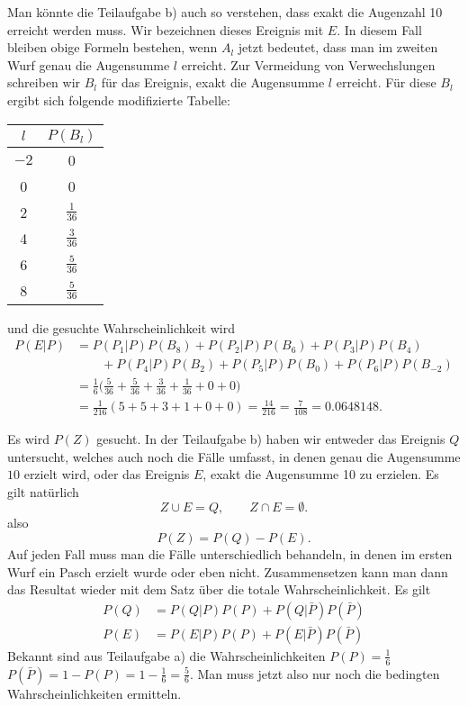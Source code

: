 \begin{loesung}
\begin{teilaufgaben}
Man könnte die Teilaufgabe b) auch so verstehen, dass exakt die
Augenzahl 10 erreicht werden muss. Wir bezeichnen dieses Ereignis
mit $E$. In diesem Fall bleiben obige
Formeln bestehen, wenn $A_l$ jetzt bedeutet, dass man im zweiten
Wurf genau die Augensumme $l$ erreicht. Zur Vermeidung von Verwechslungen
schreiben wir $B_l$ für das Ereignis, exakt die Augensumme $l$ erreicht.
Für diese $B_l$ ergibt sich
folgende modifizierte Tabelle:
\begin{center}
\begin{tabular}{|c|c|}
\hline
$l$&$P(B_l)$\\
\hline
$-2$&0\\
0&0\\
2&$\frac{1}{36}$\\
4&$\frac{3}{36}$\\
6&$\frac{5}{36}$\\
8&$\frac{5}{36}$\\
\hline
\end{tabular}
\end{center}
und die gesuchte Wahrscheinlichkeit wird
\begin{align*}
P(E|P)
&=P(P_1|P) P(B_8) + P(P_2|P) P(B_6) + P(P_3|P) P(B_4) \\
&\qquad + P(P_4|P)P(B_2) + P(P_5|P) P(B_0) + P(P_6|P) P(B_{-2})\\
&=
\frac1{6}\biggl(\frac{5}{36} + \frac{5}{36} + \frac{3}{36} + \frac{1}{36} + 0 + 0\biggr)
\\
&=
\frac1{216}(5 + 5 + 3 + 1 + 0 + 0)
=
\frac{14}{216}=\frac{7}{108}=0.0648148.
\end{align*}

\item
Es wird $P(Z)$ gesucht.
In der Teilaufgabe b) haben wir entweder das Ereignis
$Q$ untersucht, welches auch noch die Fälle umfasst, in denen genau
die Augensumme $10$ erzielt wird, oder das Ereignis $E$, exakt die Augensumme
10 zu erzielen. Es gilt natürlich
\[
Z\cup E = Q,\qquad Z\cap E=\emptyset.
\]
also
\[
P(Z)=P(Q)-P(E).
\]
Auf jeden Fall muss man die Fälle unterschiedlich behandeln, in denen
im ersten Wurf ein Pasch erzielt wurde oder eben nicht. Zusammensetzen
kann man dann das Resultat wieder mit dem Satz über die totale
Wahrscheinlichkeit. Es gilt
\begin{align*}
P(Q)&=P(Q|P)P(P) + P(Q|\bar P)P(\bar P)\\
P(E)&=P(E|P)P(P) + P(E|\bar P)P(\bar P)
\end{align*}
Bekannt sind aus Teilaufgabe a) die Wahrscheinlichkeiten
$P(P)=\frac16$
$P(\bar P)=1-P(P)=1-\frac16=\frac56$. Man muss jetzt also nur noch die
bedingten Wahrscheinlichkeiten ermitteln.


\end{teilaufgaben}
\end{loesung}
